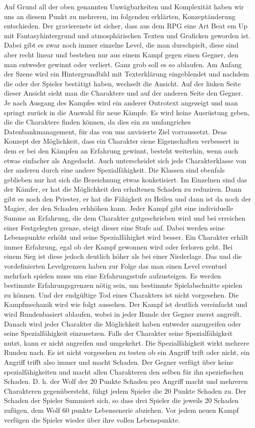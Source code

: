 Auf Grund all der oben genannten Unwägbarkeiten und Komplexität haben wir uns an diesem Punkt zu mehreren, im folgenden erklärten, Konzeptänderung entschieden. 
Der gravierenste ist sicher, dass aus dem RPG eine Art Beat em Up mit Fantasyhintergrund und atmosphärischen Texten und Graficken geworden ist. Dabei gibt es zwar noch immer einzelne Level, die man durschpielt, diese sind aber recht linear und bestehen nur aus einem Kampf gegen einen Gegner, den man entweder gewinnt oder verliert. Ganz grob soll es so ablaufen. Am Anfang der Szene wird ein Hintergrundbild mit Texterklärung eingeblendet und nachdem die oder der Spieler bestätigt haben, wechselt die Ansicht. Auf der linken Seite dieser Ansicht sieht man die Charaktere und auf der anderen Seite den Gegner. Je nach Ausgang des Kampfes wird ein anderer Outrotext angezeigt und man springt zurück in die Auswahl für neue Kämpfe. Es wird keine Ausrüstung geben, die die Charaktere finden können, da dies ein zu umfangriches Datenbankmanagement, für das von uns anvisierte Ziel vorraussetzt. Deas Konzept der Möglichkeit, dass ein Charakter siene Eigenschaften verbessert in dem er bei den Kämpfen an Erfahrung gewinnt, besteht weiterhin, wenn auch etwas einfacher als Angedacht. Auch unterscheidet sich jede Charakterklasse von der anderen durch eine andere Spezialfähigkeit. Die Klassen sind ebenfals geblieben nur hat sich die Bezeichnung etwas konketisiert. Im Einzelnen sind das der Kämfer, er hat die Möglichkeit den erhaltenen Schaden zu reduziren. Dann gibt es noch den Priester, er hat die Fähigkeit zu Heilen und dann ist da noch der Magier, der den Schaden erhhöhen kann. Jeder Kampf gibt eine individuelle Summe an Erfahrung, die dem Charakter gutgeschrieben wird und bei erreichen einer Festgelegten grenze, steigt dieser eine Stufe auf. Dabei werden seine Lebenspunkte erhöht und seine Spezialfähigket wird besser. Ein Charakter erhält immer Erfahrung, egal ob der Kampf gewonnen wird oder ferloren geht. Bei einem Sieg ist diese jedoch deutlich höher als bei einer Niederlage. Das und die vordefinierten Levelgrenzen haben zur Folge das man einen Level eventuel mehrfach spielen muss um eine Erfahrungsstufe aufzusteigen. Es werden bestimmte Erfahrungsgrenzen nötig sein, um bestimmte Spielabschnitte spielen zu können. Und der endgültige Tod eines Charakters ist nicht vorgesehen. Die Kampfmechanik wird wie folgt aussehen. Der Kampf ist deutlich vereinfacht und wird Rundenbasiert ablaufen, wobei in jeder Runde der Gegner zuerst angreift. Danach wird jeder Charakter die Möglichkeit haben entweder anzugreifen oder seine Spezialfähigkeit einzusetzen. Falls der Charakter seine Spezialfähigkeit nutzt, kann er nicht angreifen und umgekehrt. Die Spezialfähigkeit wirkt mehrere Runden nach. Es ist nicht vorgesehen zu testen ob ein Angriff trift oder nicht, ein Angriff trifft also immer und macht Schaden. Der Gegner verfügt über keine spezialfähigkeiten und macht allen Charakteren den selben für ihn speziefischen Schaden. D. h. der Wolf der 20 Punkte Schaden pro Angriff macht und mehreren Charakteren gegenübersteht, fühgt jedem Spieler die 20 Punkte Schaden zu. Der Schaden der Spieler Summiert sich, so dass drei Spieler die jeweils 20 Schaden zufügen, dem Wolf 60 punkte Lebensenerie abziehen. Vor jedem neuen Kampf verfügen die Spieler wieder über ihre vollen Lebenspunkte. 
